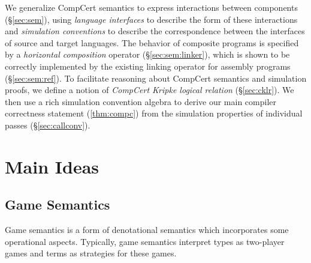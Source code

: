 \documentclass[sigplan,screen]{acmart}
\begin{document}
We generalize CompCert semantics
to express interactions between components (\S\ref{sec:sem}),
using \emph{language interfaces}
to describe the form of these interactions
and \emph{simulation conventions}
to describe the correspondence between the interfaces
of source and target languages.
The behavior of
composite programs is specified by a
\emph{horizontal composition} operator (\S\ref{sec:sem:linker}),
which is shown to be correctly implemented
by the existing linking operator for assembly programs
(\S\ref{sec:sem:ref}).
To facilitate reasoning about CompCert semantics and simulation proofs,
we define a notion of
\emph{CompCert Kripke logical relation} (\S\ref{sec:cklr}).
We then use a rich simulation convention algebra
to derive our main compiler correctness statement (\autoref{thm:compc})
from the simulation properties
of individual passes
(\S\ref{sec:callconv}).





\section{Main Ideas} \label{sec:mainideas} %

\subsection{Game Semantics} \label{sec:gamesem} %


Game semantics is a form of denotational semantics which
incorporates some operational aspects.
Typically,
game semantics interpret
types as two-player games
and terms as strategies for these games.
\end{document}
